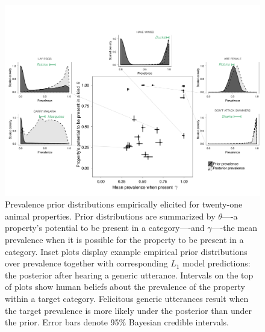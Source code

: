 \documentclass{pnastwo}
\begin{document}
\begin{figure}
\centering
    \includegraphics[width=\columnwidth]{prevalence-scatter-wDists2.pdf}
    \caption{Prevalence prior distributions empirically elicited for twenty-one animal properties.
    Prior distributions are summarized by $\theta$----a property's potential to be present in a category----and $\gamma$----the mean prevalence when it is possible for the property to be present in a category.
    Inset plots display example empirical prior distributions over prevalence together with corresponding $L_1$ model predictions: the posterior after hearing a generic utterance. 
    Intervals on the top of plots show human beliefs about the prevalence of the property within a target category.
    Felicitous generic utterances result when the target prevalence is more likely under the posterior than under the prior.
     Error bars denote 95\% Bayesian credible intervals.
    }
  \label{fig:priors1a}
\end{figure}
\end{document}
